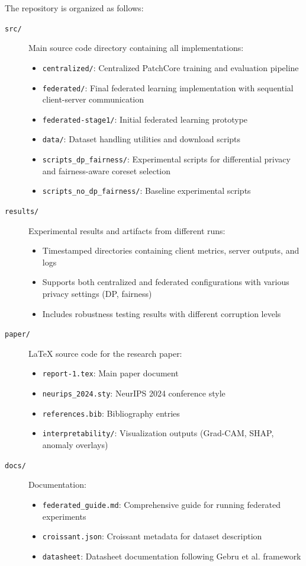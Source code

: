 \documentclass{article}
\begin{document}
The repository is organized as follows:

\begin{description}
    \item[\texttt{src/}] Main source code directory containing all implementations:
    \begin{itemize}
        \item \texttt{centralized/}: Centralized PatchCore training and evaluation pipeline
        \item \texttt{federated/}: Final federated learning implementation with sequential client-server communication
        \item \texttt{federated-stage1/}: Initial federated learning prototype
        \item \texttt{data/}: Dataset handling utilities and download scripts
        \item \texttt{scripts\_dp\_fairness/}: Experimental scripts for differential privacy and fairness-aware coreset selection
        \item \texttt{scripts\_no\_dp\_fairness/}: Baseline experimental scripts
    \end{itemize}

    \item[\texttt{results/}] Experimental results and artifacts from different runs:
    \begin{itemize}
        \item Timestamped directories containing client metrics, server outputs, and logs
        \item Supports both centralized and federated configurations with various privacy settings (DP, fairness)
        \item Includes robustness testing results with different corruption levels
    \end{itemize}

    \item[\texttt{paper/}] LaTeX source code for the research paper:
    \begin{itemize}
        \item \texttt{report-1.tex}: Main paper document
        \item \texttt{neurips\_2024.sty}: NeurIPS 2024 conference style
        \item \texttt{references.bib}: Bibliography entries
        \item \texttt{interpretability/}: Visualization outputs (Grad-CAM, SHAP, anomaly overlays)
    \end{itemize}

    \item[\texttt{docs/}] Documentation:
    \begin{itemize}
        \item \texttt{federated\_guide.md}: Comprehensive guide for running federated experiments
        \item \texttt{croissant.json}: Croissant metadata for dataset description
        \item \texttt{datasheet}: Datasheet documentation following Gebru et al. framework
    \end{itemize}
\end{description}
\end{document}
